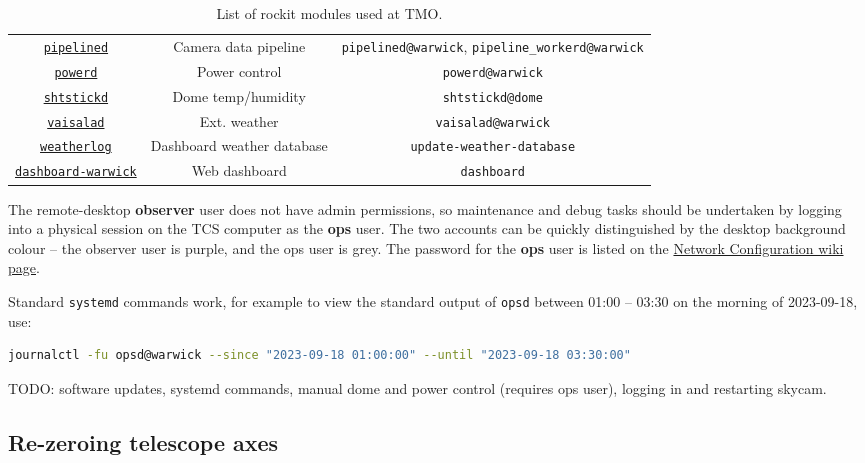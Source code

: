 \documentclass[12pt,a4paper]{article}
\begin{document}
\begin{table}
\begin{tabular}{c|c|c}
        \href{https://github.com/rockit-astro/pipelined}{\texttt{pipelined}} & Camera data pipeline & \texttt{pipelined@warwick}, \texttt{pipeline\_workerd@warwick}\\
        \href{https://github.com/rockit-astro/powerd}{\texttt{powerd}} & Power control & \texttt{powerd@warwick}\\
        \href{https://github.com/rockit-astro/shtstickd}{\texttt{shtstickd}} & Dome temp/humidity & \texttt{shtstickd@dome}\\
        \href{https://github.com/rockit-astro/vaisalad}{\texttt{vaisalad}} & Ext. weather & \texttt{vaisalad@warwick}\\
        \href{https://github.com/rockit-astro/weatherlog}{\texttt{weatherlog}} & Dashboard weather database & \texttt{update-weather-database}\\
        \href{https://github.com/rockit-astro/dashboard-warwick}{\texttt{dashboard-warwick}} & Web dashboard & \texttt{dashboard}\\
    \end{tabular}
    \caption{List of rockit modules used at TMO.}
    \label{tab:rockit-modules}
\end{table}

The remote-desktop \textbf{observer} user does not have admin permissions, so maintenance and debug tasks should be undertaken by logging into a physical session on the TCS computer as the \textbf{ops} user. The two accounts can be quickly distinguished by the desktop background colour -- the observer user is purple, and the ops user is grey. The password for the \textbf{ops} user is listed on the \href{https://github.com/WarwickWindmillHill/docs/wiki/Network-configuration}{Network Configuration wiki page}.


Standard \texttt{systemd} commands work, for example to view the standard output of \texttt{opsd} between 01:00 -- 03:30 on the morning of 2023-09-18, use: 

{\footnotesize
\begin{lstlisting}[language=sh]
journalctl -fu opsd@warwick --since "2023-09-18 01:00:00" --until "2023-09-18 03:30:00"
\end{lstlisting}
}
TODO: software updates, systemd commands, manual dome and power control (requires ops user), logging in and restarting skycam.

\subsection{Re-zeroing telescope axes}\label{sec:zerotelescope}
\end{document}
